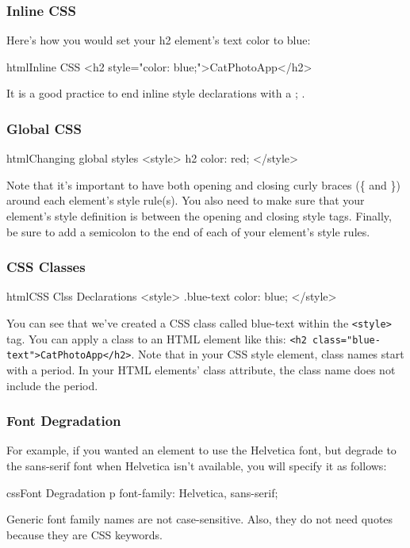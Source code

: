 \subsubsection{Inline CSS}
Here's how you would set your h2 element's text color to blue:

\begin{codeBlock}{html}{Inline CSS}
<h2 style="color: blue;">CatPhotoApp</h2>
\end{codeBlock}

\begin{tcolorbox}
It is a good practice to end inline style declarations with a ; .
\end{tcolorbox}

\subsubsection{Global CSS}
\begin{codeBlock}{html}{Changing global styles}
<style>
  h2 {
    color: red;
  }
</style>
\end{codeBlock}
Note that it's important to have both opening and closing curly braces (\{ and \}) around each element's style rule(s). You also need to make sure that your element's style definition is between the opening and closing style tags. Finally, be sure to add a semicolon to the end of each of your element's style rules.

\subsubsection{CSS Classes}
\begin{codeBlock}{html}{CSS Clss Declarations}
<style>
  .blue-text {
    color: blue;
  }
</style>
\end{codeBlock}

You can see that we've created a CSS class called blue-text within the \texttt{<style>} tag. You can apply a class to an HTML element like this: \texttt{<h2 class="blue-text">CatPhotoApp</h2>}. Note that in your CSS style element, class names start with a period. In your HTML elements' class attribute, the class name does not include the period.

\subsubsection{Font Degradation}
For example, if you wanted an element to use the Helvetica font, but degrade to the sans-serif font when Helvetica isn't available, you will specify it as follows:
\begin{codeBlock}{css}{Font Degradation}
p {
  font-family: Helvetica, sans-serif;
}
\end{codeBlock}
Generic font family names are not case-sensitive. Also, they do not need quotes because they are CSS keywords.


